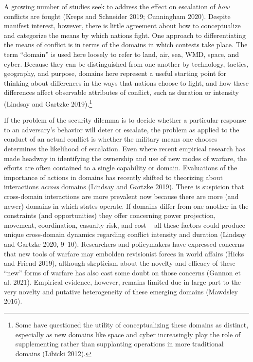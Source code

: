 \documentclass[
]{article}
\begin{document}
A growing number of studies seek to address the effect on escalation of \textit{how} conflicts are fought (Kreps and Schneider 2019; Cunningham 2020). Despite manifest interest, however, there is little agreement about how to conceptualize and categorize the means by which nations fight. One approach to differentiating the means of conflict is in terms of the domains in which contests take place. The term ``domain'' is used here loosely to refer to land, air, sea, WMD, space, and cyber. Because they can be distinguished from one another by technology, tactics, geography, and purpose, domains here represent a useful starting point for thinking about differences in the ways that nations choose to fight, and how these differences affect observable attributes of conflict, such as duration or intensity (Lindsay and Gartzke 2019).\footnote{Some have questioned the utility of conceptualizing these domains as distinct, especially as new domains like space and cyber increasingly play the role of supplementing rather than supplanting operations in more traditional domains (Libicki 2012).}

If the problem of the security dilemma is to decide whether a particular response to an adversary's behavior will deter or escalate, the problem as applied to the conduct of an actual conflict is whether the military means one chooses determines the likelihood of escalation. Even where recent empirical research has made headway in identifying the ownership and use of new modes of warfare, the efforts are often contained to a single capability or domain. Evaluations of the importance of actions in domains has recently shifted to theorizing about interactions \emph{across} domains (Lindsay and Gartzke 2019). There is suspicion that cross-domain interactions are more prevalent now because there are more (and newer) domains in which states operate. If domains differ from one another in the constraints (and opportunities) they offer concerning power projection, movement, coordination, casualty risk, and cost -- all these factors could produce unique cross-domain dynamics regarding conflict intensity and duration (Lindsay and Gartzke 2020, 9--10). Researchers and policymakers have expressed concerns that new tools of warfare may embolden revisionist forces in world affairs (Hicks and Friend 2019), although skepticism about the novelty and efficacy of these ``new'' forms of warfare has also cast some doubt on those concerns (Gannon et al. 2021). Empirical evidence, however, remains limited due in large part to the very novelty and putative heterogeneity of these emerging domains (Mawdsley 2016).
\end{document}
